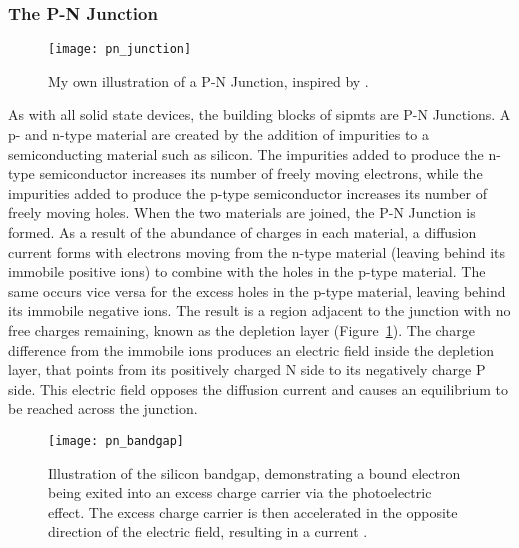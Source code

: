 \subsubsection{The P-N Junction}

\begin{figure}
	\centering
    \texttt{[image: pn\_junction]} 
	\caption[A typical illustration of a P-N Junction.]{My own illustration of a P-N Junction, inspired by \textcite{Ghassemi2017}.}
	\label{fig:pn_junction}
\end{figure}

As with all solid state devices, the building blocks of \glspl{sipmt} are P-N Junctions. A p- and n-type material are created by the addition of impurities to a semiconducting material such as silicon. The impurities added to produce the n-type semiconductor increases its number of freely moving electrons, while the impurities added to produce the p-type semiconductor increases its number of freely moving holes. When the two materials are joined, the P-N Junction is formed. As a result of the abundance of charges in each material, a diffusion current forms with electrons moving from the n-type material (leaving behind its immobile positive ions) to combine with the holes in the p-type material. The same occurs vice versa for the excess holes in the p-type material, leaving behind its immobile negative ions. The result is a region adjacent to the junction with no free charges remaining, known as the depletion layer (Figure~\ref{fig:pn_junction}). The charge difference from the immobile ions  produces an electric field inside the depletion layer, that points from its positively charged N side to its negatively charge P side. This electric field opposes the diffusion current and causes an equilibrium to be reached across the junction.

\begin{figure}
	\centering
    \texttt{[image: pn\_bandgap]} 
	\caption[Illustration of the silicon bandgap.]{Illustration of the silicon bandgap, demonstrating a bound electron being exited into an excess charge carrier via the photoelectric effect. The excess charge carrier is then accelerated in the opposite direction of the electric field, resulting in a current \cite{Ghassemi2017}.}
	\label{fig:pn_bandgap}
\end{figure}

